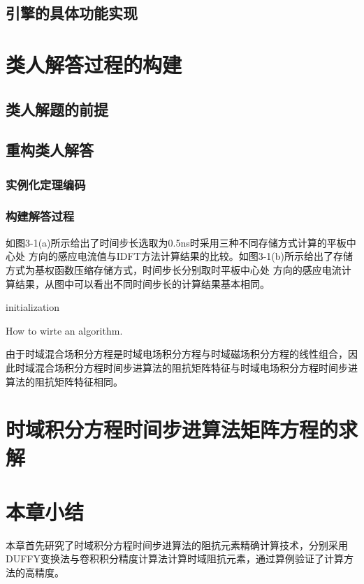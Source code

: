 \documentclass{standalone}
\begin{document}
\subsection{引擎的具体功能实现}

\section{类人解答过程的构建}

\subsection{类人解题的前提}

\subsection{重构类人解答}

\subsubsection{实例化定理编码}

\subsubsection{构建解答过程}



如图3-1(a)所示给出了时间步长选取为0.5ns时采用三种不同存储方式计算的平板中心处 方向的感应电流值与IDFT方法计算结果的比较。如图3-1(b)所示给出了存储方式为基权函数压缩存储方式，时间步长分别取时平板中心处 方向的感应电流计算结果，从图中可以看出不同时间步长的计算结果基本相同。

\begin{algorithm}[H]
	initialization\;
\caption{How to wirte an algorithm.}
\end{algorithm}

由于时域混合场积分方程是时域电场积分方程与时域磁场积分方程的线性组合，因此时域混合场积分方程时间步进算法的阻抗矩阵特征与时域电场积分方程时间步进算法的阻抗矩阵特征相同。

\section{时域积分方程时间步进算法矩阵方程的求解}

\section{本章小结}
本章首先研究了时域积分方程时间步进算法的阻抗元素精确计算技术，分别采用DUFFY变换法与卷积积分精度计算法计算时域阻抗元素，通过算例验证了计算方法的高精度。
\end{document}
